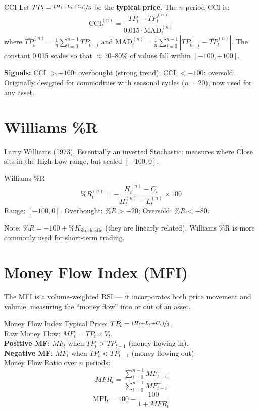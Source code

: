 \documentclass[12pt,a4paper,openany]{report}
\theoremstyle{definition}
\begin{document}
\begin{definitionbox}{CCI}
Let $TP_t = \nicefrac{(H_t + L_t + C_t)}{3}$ be the \textbf{typical price}. The $n$-period CCI is:
\[
  \text{CCI}_t^{(n)} = \frac{TP_t - \overline{TP}_t^{(n)}}{0.015 \cdot \text{MAD}_t^{(n)}}
\]
where $\overline{TP}_t^{(n)} = \frac{1}{n}\sum_{i=0}^{n-1} TP_{t-i}$ and $\text{MAD}_t^{(n)} = \frac{1}{n}\sum_{i=0}^{n-1}|TP_{t-i} - \overline{TP}_t^{(n)}|$. The constant 0.015 scales so that $\approx 70$--80\% of values fall within $[-100, +100]$.
\end{definitionbox}

\textbf{Signals:} CCI $> +100$: overbought (strong trend); CCI $< -100$: oversold. Originally designed for commodities with seasonal cycles ($n = 20$), now used for any asset.

\section{Williams \%R}

Larry Williams (1973). Essentially an inverted Stochastic: measures where Close sits in the High-Low range, but scaled $[-100, 0]$.

\begin{definitionbox}{Williams \%R}
\[
  \%R_t^{(n)} = -\frac{H_t^{(n)} - C_t}{H_t^{(n)} - L_t^{(n)}} \times 100
\]
Range: $[-100, 0]$. Overbought: $\%R > -20$; Oversold: $\%R < -80$.
\end{definitionbox}

Note: $\%R = -100 + \%K_{\text{Stochastic}}$ (they are linearly related). Williams \%R is more commonly used for short-term trading.

\section{Money Flow Index (MFI)}

The MFI is a volume-weighted RSI — it incorporates both price movement and volume, measuring the ``money flow'' into or out of an asset.

\begin{definitionbox}{Money Flow Index}
Typical Price: $TP_t = \nicefrac{(H_t + L_t + C_t)}{3}$. \\
Raw Money Flow: $MF_t = TP_t \times V_t$. \\
\textbf{Positive MF}: $MF_t$ when $TP_t > TP_{t-1}$ (money flowing in). \\
\textbf{Negative MF}: $MF_t$ when $TP_t < TP_{t-1}$ (money flowing out). \\
Money Flow Ratio over $n$ periods:
\[
  MFR_t = \frac{\sum_{i=0}^{n-1} MF^+_{t-i}}{\sum_{i=0}^{n-1} MF^-_{t-i}}
\]
\[
  \text{MFI}_t = 100 - \frac{100}{1 + MFR_t}
\]
\end{definitionbox}
\end{document}
